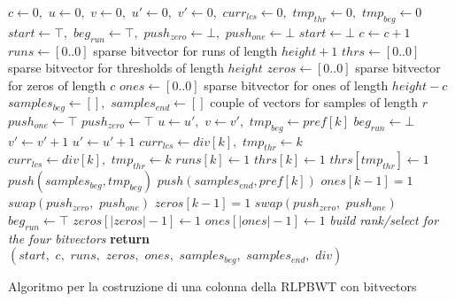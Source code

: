\documentclass[a4paper,12pt, oneside]{book}
\begin{document}
\begin{algorithm}[H]
  \scriptsize
  \begin{algorithmic}[1]
    \State $c\gets 0,\,\,u\gets 0,\,\,v\gets 0,\,\,u'\gets 0,\,\, v'\gets
    0,\,\,curr_{lcs}\gets 0,\,\,tmp_{thr}\gets 0,\,\,tmp_{beg}\gets 0$
    \State $start \gets \top,\,\,beg_{run}\gets \top,\,\,push_{zero}\gets
    \bot,\,\,push_{one}\gets \bot$
    \For {\textit{every} $k\in\left[0,\,\, height\right)$}
    \State $start \gets \bot$
    \EndIf
    \State $c\gets c+1$
    \EndIf
    \EndFor
    \State $runs\gets[0..0]$
    \Comment sparse bitvector for runs of length $height+1$
    \State $thrs\gets[0..0]$
    \Comment sparse bitvector for thresholds of length $height$
    \State $zeros\gets[0..0]$
    \Comment sparse bitvector for zeros of length $c$
    \State $ones\gets[0..0]$
    \Comment sparse bitvector for ones of length $height-c$
    \State $samples_{beg} \gets [],\,\,samples_{end}\gets []$
    \Comment couple of vectors for samples of length $r$
    \State $push_{one}\gets \top$
    \Else
    \State $push_{zero}\gets \top$
    \EndIf
    \For {\textit{every} $k\in\left[0,\,\, height\right)$}
    \State $u\gets u',\,\,v\gets v',\,\,tmp_{beg}\gets pref[k]$
    \State $beg_{run}\gets \bot$
    \EndIf
    \State $v'\gets v'+1$
    \Else
    \State $u'\gets u'+1$
    \EndIf
    \State $curr_{lcs}\gets div[k],\,\,tmp_{thr}\gets k$
    \EndIf
    \State $curr_{lcs}\gets div[k],\,\,tmp_{thr}\gets k$
    \EndIf
    \State $runs[k]\gets 1$
    \State $thrs[k]\gets 1$
    \Else
    \State $thrs[tmp_{thr}]\gets 1$
    \EndIf
    \State $push(samples_{beg}, tmp_{beg})$
    \State $push(samples_{end}, pref[k])$
    \State $ones[k-1]=1$
    \EndIf
    \State $swap(push_{zero},\,\,push_{one})$
    \Else
    \State $zeros[k-1]=1$
    \EndIf
    \State $swap(push_{zero},\,\,push_{one})$
    \EndIf
    \State $beg_{run}\gets \top$
    \EndIf
    \EndFor
    \State $zeros[|zeros|-1]\gets 1$
    \EndIf
    \State $ones[|ones|-1]\gets 1$
    \EndIf
    \State \textit{build rank/select for the four bitvectors}
    \State \textbf{return}
    $(start,\,\,c,\,\,runs,\,\,zeros,\,\,ones,\,\,samples_{beg},\,\,samples_{end},\,\,div)$ 
    \EndFunction
  \end{algorithmic}
  \caption{{\footnotesize{Algoritmo per la costruzione di una colonna della RLPBWT con bitvectors}}}
\end{algorithm}
\end{document}
